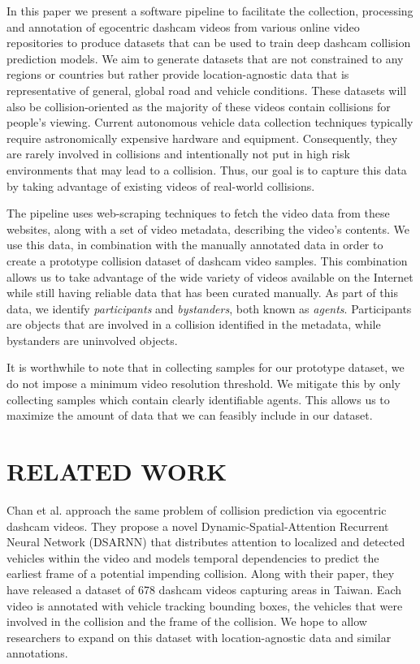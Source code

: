 \documentclass[letterpaper, 10 pt, conference]{ieeeconf}
\begin{document}
In this paper we present a software pipeline to facilitate the collection, processing and annotation of egocentric dashcam videos from various online video repositories to produce datasets that can be used to train deep dashcam collision prediction models.
We aim to generate datasets that are not constrained to any regions or countries but rather provide location-agnostic data that is representative of general, global road and vehicle conditions.
These datasets will also be collision-oriented as the majority of these videos contain collisions for people's viewing.
Current autonomous vehicle data collection techniques typically require astronomically expensive hardware and equipment. Consequently, they are rarely involved in collisions and intentionally not put in high risk environments that may lead to a collision.
Thus, our goal is to capture this data by taking advantage of existing videos of real-world collisions.

The pipeline uses web-scraping techniques to fetch the video data from these websites, along with a set of video metadata, describing the video's contents.
We use this data, in combination with the manually annotated data in order to create a prototype collision dataset of dashcam video samples.
This combination allows us to take advantage of the wide variety of videos available on the Internet while still having reliable data that has been curated manually.
As part of this data, we identify \textit{participants} and \textit{bystanders}, both known as \textit{agents}. Participants are objects that are involved in a collision identified in the metadata, while bystanders are uninvolved objects.

It is worthwhile to note that in collecting samples for our prototype dataset, we do not impose a minimum video resolution threshold. We mitigate this by only collecting samples which contain clearly identifiable agents. This allows us to maximize the amount of data that we can feasibly include in our dataset.

\section{RELATED WORK}

Chan et al. \cite{chan2016anticipating} approach the same problem of collision prediction via egocentric dashcam videos. They propose a novel Dynamic-Spatial-Attention Recurrent Neural Network (DSARNN) that distributes attention to localized and detected vehicles within the video and models temporal dependencies to predict the earliest frame of a potential impending collision. Along with their paper, they have released a dataset of 678 dashcam videos capturing areas in Taiwan. Each video is annotated with vehicle tracking bounding boxes, the vehicles that were involved in the collision and the frame of the collision. We hope to allow researchers to expand on this dataset with location-agnostic data and similar annotations.
\end{document}
